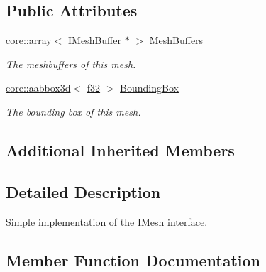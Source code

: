 \subsection*{Public Attributes}
\begin{DoxyCompactItemize}
\item 
\mbox{\label{structirr_1_1scene_1_1SMesh_a44c86ee55fad687a39e2249a9db47039}} 
\hyperlink{classirr_1_1core_1_1array}{core\+::array}$<$ \hyperlink{classirr_1_1scene_1_1IMeshBuffer}{I\+Mesh\+Buffer} $\ast$ $>$ \hyperlink{structirr_1_1scene_1_1SMesh_a44c86ee55fad687a39e2249a9db47039}{Mesh\+Buffers}
\begin{DoxyCompactList}\small\item\em The meshbuffers of this mesh. \end{DoxyCompactList}\item 
\mbox{\label{structirr_1_1scene_1_1SMesh_a606819ef7ab5451a5b983d98ad5ec2b6}} 
\hyperlink{classirr_1_1core_1_1aabbox3d}{core\+::aabbox3d}$<$ \hyperlink{namespaceirr_a0277be98d67dc26ff93b1a6a1d086b07}{f32} $>$ \hyperlink{structirr_1_1scene_1_1SMesh_a606819ef7ab5451a5b983d98ad5ec2b6}{Bounding\+Box}
\begin{DoxyCompactList}\small\item\em The bounding box of this mesh. \end{DoxyCompactList}\end{DoxyCompactItemize}
\subsection*{Additional Inherited Members}


\subsection{Detailed Description}
Simple implementation of the \hyperlink{classirr_1_1scene_1_1IMesh}{I\+Mesh} interface. 

\subsection{Member Function Documentation}
\mbox{\label{structirr_1_1scene_1_1SMesh_a890e7506262b2ebaf45ff95c681452bd}} 
